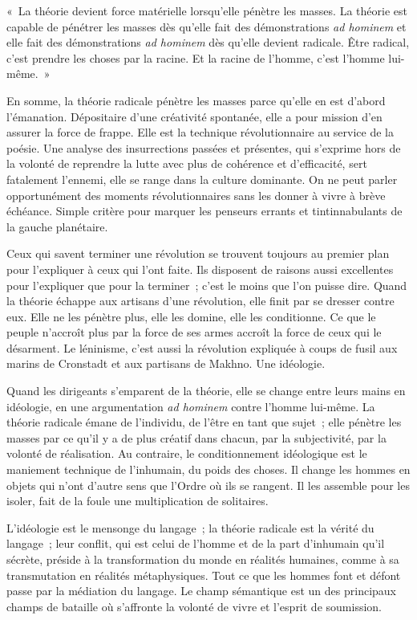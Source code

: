 \documentclass[french,twoside]{book} %
\newenvironment{quoteblock}%
  {\begin{quoting}}
  {\end{quoting}}
\newenvironment{quotebar}{%
    \def\FrameCommand{{\color{rubric!10!}\vrule width 0.5em} \hspace{0.9em}}%
    \def\OuterFrameSep{\itemsep} %
    \MakeFramed {\advance\hsize-\width \FrameRestore}
  }%
  {%
    \endMakeFramed
  }
\renewenvironment{quoteblock}%
  {%
    \savenotes
    \setstretch{0.9}
    \normalfont
    \begin{quotebar}
  }
  {%
    \end{quotebar}
    \spewnotes
  }
\begin{document}
\begin{quoteblock}
\noindent « La théorie devient force matérielle lorsqu’elle pénètre les masses. La théorie est capable de pénétrer les masses dès qu’elle fait des démonstrations \emph{ad hominem} et elle fait des démonstrations \emph{ad hominem} dès qu’elle devient radicale. Être radical, c’est prendre les choses par la racine. Et la racine de l’homme, c’est l’homme lui-même. »\end{quoteblock}

\noindent En somme, la théorie radicale pénètre les masses parce qu’elle en est d’abord l’émanation. Dépositaire d’une créativité spontanée, elle a pour mission d’en assurer la force de frappe. Elle est la technique révolutionnaire au service de la poésie. Une analyse des insurrections passées et présentes, qui s’exprime hors de la volonté de reprendre la lutte avec plus de cohérence et d’efficacité, sert fatalement l’ennemi, elle se range dans la culture dominante. On ne peut parler opportunément des moments révolutionnaires sans les donner à vivre à brève échéance. Simple critère pour marquer les penseurs errants et tintinnabulants de la gauche planétaire.\par
Ceux qui savent terminer une révolution se trouvent toujours au premier plan pour l’expliquer à ceux qui l’ont faite. Ils disposent de raisons aussi excellentes pour l’expliquer que pour la terminer ; c’est le moins que l’on puisse dire. Quand la théorie échappe aux artisans d’une révolution, elle finit par se dresser contre eux. Elle ne les pénètre plus, elle les domine, elle les conditionne. Ce que le peuple n’accroît plus par la force de ses armes accroît la force de ceux qui le désarment. Le léninisme, c’est aussi la révolution expliquée à coups de fusil aux marins de Cronstadt et aux partisans de Makhno. Une idéologie.\par
Quand les dirigeants s’emparent de la théorie, elle se change entre leurs mains en idéologie, en une argumentation \emph{ad hominem} contre l’homme lui-même. La théorie radicale émane de l’individu, de l’être en tant que sujet ; elle pénètre les masses par ce qu’il y a de plus créatif dans chacun, par la subjectivité, par la volonté de réalisation. Au contraire, le conditionnement idéologique est le maniement technique de l’inhumain, du poids des choses. Il change les hommes en objets qui n’ont d’autre sens que l’Ordre où ils se rangent. Il les assemble pour les isoler, fait de la foule une multiplication de solitaires.\par
L’idéologie est le mensonge du langage ; la théorie radicale est la vérité du langage ; leur conflit, qui est celui de l’homme et de la part d’inhumain qu’il sécrète, préside à la transformation du monde en réalités humaines, comme à sa transmutation en réalités métaphysiques. Tout ce que les hommes font et défont passe par la médiation du langage. Le champ sémantique est un des principaux champs de bataille où s’affronte la volonté de vivre et l’esprit de soumission.\par
\end{document}
